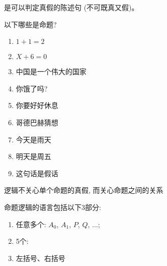 
\begin{frame}{}
  \begin{definition}[命题 (Proposition)]
    是可以判定真假的陈述句 (不可既真又假)。
  \end{definition}

  \vspace{0.30cm}
  \pause
  \begin{exampleblock}{以下哪些是命题?}
    \begin{enumerate}
      \item $1 + 1 = 2$
      \item $X + 6 = 0$
      \pause
      \item 中国是一个伟大的国家
      \item 你饿了吗?
      \item 你要好好休息
      \pause
      \item 哥德巴赫猜想
      \pause
      \item 今天是雨天
      \item 明天是周五
      \pause
      \item 这句话是假话
    \end{enumerate}
  \end{exampleblock}
\end{frame}

\begin{frame}{}
  \begin{center}

    \vspace{1.00cm}
    逻辑不关心单个命题的真假, 而关心命题之间的关系
  \end{center}
\end{frame}

\begin{frame}{}
  \begin{definition}[命题逻辑的语言]
    命题逻辑的语言包括以下3部分:
    \begin{enumerate}[(1)]
      \setlength{\itemsep}{5pt}
      \item 任意多个: $A_{0}$, $A_{1}$, $P$, $Q$, $\dots$;
      \item 5个:
        
      \item 左括号、右括号
    \end{enumerate}
  \end{definition}
\end{frame}

